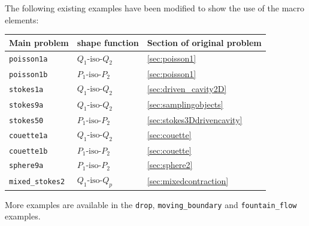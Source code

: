 The following existing examples have been modified to show the use of
the macro elements:
\begin{center}
\begin{tabular}{lll}
  Main problem & shape function & Section of original problem \\\hline
  \texttt{poisson1a} & $Q_1\text{-iso-}Q_2$ & \ref{sec:poisson1} \\ 
  \texttt{poisson1b} & $P_1\text{-iso-}P_2$ & \ref{sec:poisson1} \\ 
  \texttt{stokes1a} & $Q_1\text{-iso-}Q_2$ & \ref{sec:driven_cavity2D} \\ 
  \texttt{stokes9a} & $Q_1\text{-iso-}Q_2$ & \ref{sec:samplingobjects} \\ 
  \texttt{stokes50} & $P_1\text{-iso-}P_2$ & \ref{sec:stokes3Ddrivencavity} \\ 
  \texttt{couette1a} & $Q_1\text{-iso-}Q_2$ & \ref{sec:couette} \\ 
  \texttt{couette1b} & $P_1\text{-iso-}P_2$ & \ref{sec:couette} \\ 
  \texttt{sphere9a} & $P_1\text{-iso-}P_2$ & \ref{sec:sphere2} \\
 \texttt{mixed\_stokes2} & $Q_1\text{-iso-}Q_p$ & \ref{sec:mixedcontraction} \\
\end{tabular}
\end{center}
More examples are available in the \texttt{drop}, \texttt{moving\_boundary} and \texttt{fountain\_flow} examples.


